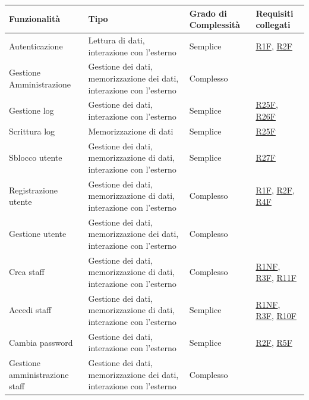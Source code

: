 \documentclass[a4paper]{article}
\begin{document}
\begin{center}
    \begin{tabularx}{1\textwidth}{|X|X|X|X|}
        \hline
        \textbf{Funzionalità} & \textbf{Tipo} & \textbf{Grado di Complessità} & \textbf{Requisiti collegati}\\
        \hline
        \hline
        Autenticazione & Lettura di dati, interazione con l'esterno & Semplice & \hyperlink{R1F}{R1F}, \hyperlink{R2F}{R2F} \\
        \hline
        Gestione Amministrazione & Gestione dei dati, memorizzazione dei dati, interazione con l'esterno & Complesso & \\
        \hline
        Gestione log & Gestione dei dati, interazione con l'esterno & Semplice & \hyperlink{R25F}{R25F}, \hyperlink{R26F}{R26F}\\
        \hline
        Scrittura log & Memorizzazione di dati & Semplice & \hyperlink{R25F}{R25F}\\
        \hline
        Sblocco utente & Gestione dei dati, memorizzazione di dati, interazione con l'esterno & Semplice & \hyperlink{R27F}{R27F}\\
        \hline
        Registrazione utente & Gestione dei dati, memorizzazione di dati, interazione con l'esterno & Complesso & \hyperlink{R1F}{R1F}, \hyperlink{R2F}{R2F}, \hyperlink{R4F}{R4F} \\
        \hline
        Gestione utente & Gestione dei dati, memorizzazione dei dati, interazione con l'esterno & Complesso & \\
        \hline
        Crea staff & Gestione dei dati, memorizzazione di dati, interazione con l'esterno & Complesso & \hyperlink{R1NF}{R1NF}, \hyperlink{R3F}{R3F}, \hyperlink{R11F}{R11F}\\
        \hline
        Accedi staff & Gestione dei dati, memorizzazione di dati, interazione con l'esterno & Semplice & \hyperlink{R1NF}{R1NF}, \hyperlink{R3F}{R3F}, \hyperlink{R10F}{R10F} \\
        \hline
        Cambia password & Gestione dei dati, interazione con l'esterno & Semplice & \hyperlink{R2F}{R2F}, \hyperlink{R5F}{R5F} \\
        \hline
        Gestione amministrazione staff & Gestione dei dati, memorizzazione dei dati, interazione con l'esterno & Complesso &  \\

\end{tabularx}
\end{center}
\end{document}
